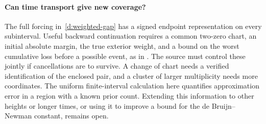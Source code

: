 \paragraph{Can time transport give new coverage?}
The full forcing in~\eqref{d:weighted-gap} has a signed endpoint representation on every subinterval. Useful backward continuation requires a common two-zero chart, an initial absolute margin, the true exterior weight, and a bound on the worst cumulative loss before a possible event, as in \cite[(4.3)]{agc}. The source must control these jointly if cancellations are to survive. A change of chart needs a verified identification of the enclosed pair, and a cluster of larger multiplicity needs more coordinates. The uniform finite-interval calculation here quantifies approximation error in a region with a known prior count. Extending this information to other heights or longer times, or using it to improve a bound for the de Bruijn--Newman constant, remains open.
